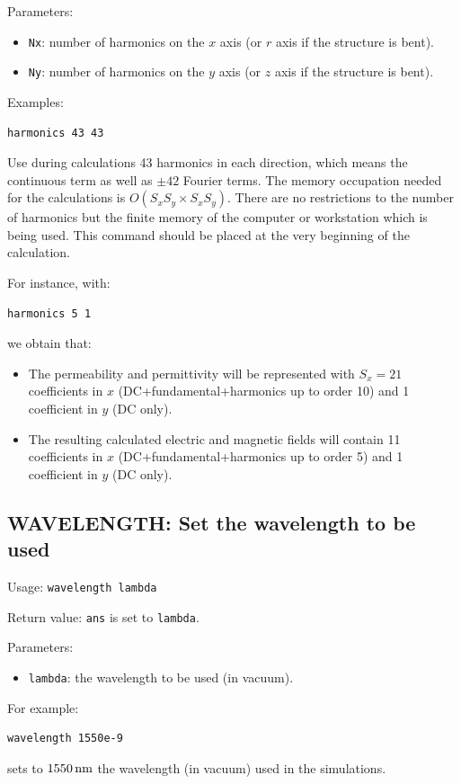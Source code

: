 Parameters:
\begin{itemize}
\item \lstinline!Nx!: number of harmonics on the $x$ axis (or $r$ axis if the structure is bent).
\item \lstinline!Ny!: number of harmonics on the $y$ axis (or $z$ axis if the structure is bent).
\end{itemize}
Examples:
\begin{lstlisting}
harmonics 43 43
\end{lstlisting}
Use during calculations 43 harmonics in each direction, which means the continuous term as well as $\pm 42$ Fourier terms. The memory occupation needed for the calculations is $O(S_xS_y \times S_xS_y)$. There are no restrictions to the number of harmonics but the finite memory of the computer or workstation which is being used. 
This command should be placed at the very beginning of the calculation.

For instance, with:
\begin{lstlisting}
harmonics 5 1
\end{lstlisting}
we obtain that:
\begin{itemize}
\item The permeability and permittivity will be represented with $S_x=21$ coefficients in $x$ (DC+fundamental+harmonics up to order 10) and 1 coefficient in $y$ (DC only).
\item The resulting calculated electric and magnetic fields will contain 11 coefficients in $x$ (DC+fundamental+harmonics up to order 5) and 1 coefficient in $y$ (DC only).
\end{itemize}

\subsection{WAVELENGTH: Set the wavelength to be used}
\label{subsec_wavelength}
Usage: \lstinline!wavelength lambda!

Return value: \lstinline!ans! is set to \lstinline!lambda!.

Parameters:
\begin{itemize}
\item \lstinline!lambda!: the wavelength to be used (in vacuum).
\end{itemize}

For example:
\begin{lstlisting}
wavelength 1550e-9
\end{lstlisting}
sets to $1550\,\mathrm{nm}$ the wavelength (in vacuum) used in the simulations.

